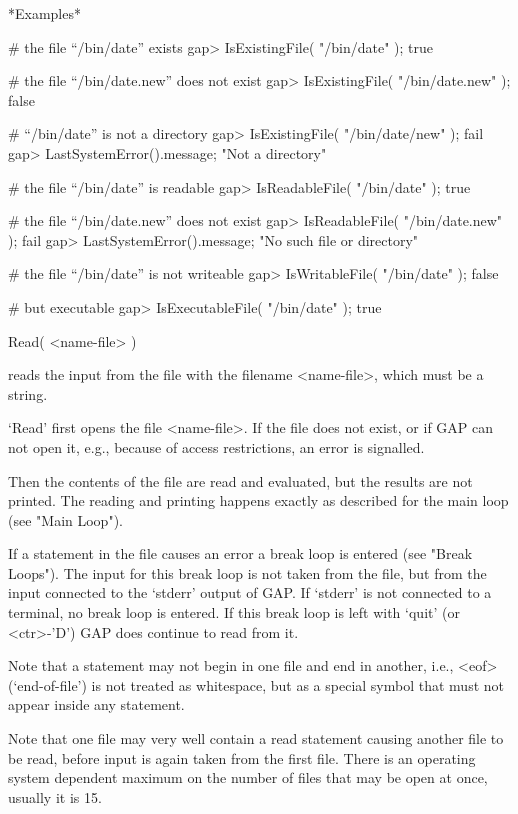 *Examples*

\beginexample
    # the file ``/bin/date'' exists
    gap> IsExistingFile( "/bin/date" );    
    true

    # the file ``/bin/date.new'' does not exist
    gap> IsExistingFile( "/bin/date.new" );
    false

    # ``/bin/date'' is not a directory
    gap> IsExistingFile( "/bin/date/new" );
    fail
    gap> LastSystemError().message;
    "Not a directory"

    # the file ``/bin/date'' is readable
    gap> IsReadableFile( "/bin/date" );
    true

    # the file ``/bin/date.new'' does not exist
    gap> IsReadableFile( "/bin/date.new" );
    fail
    gap> LastSystemError().message;        
    "No such file or directory"

    # the file ``/bin/date'' is not writeable
    gap> IsWritableFile( "/bin/date" );
    false

    # but executable
    gap> IsExecutableFile( "/bin/date" );
    true
\endexample



\>Read( <name-file> )

reads the input from the  file with the  filename <name-file>, which must
be a string.

`Read' first opens the file <name-file>.  If the file  does not exist, or
if GAP can not open it, e.g., because of access restrictions, an error is
signalled.

Then the contents of the file are read and evaluated, but the results are
not printed.  The reading and  printing happens exactly as described  for
the main loop (see "Main Loop").

If a statement in the file causes  an error a  break loop is entered (see
"Break  Loops").  The input   for this break loop  is  not taken from the
file, but from  the input connected to the  `stderr'  output of GAP.   If
`stderr' is not connected  to a terminal, no break  loop is  entered.  If
this break loop is left  with `quit' (or <ctr>-'D')  GAP does continue to
read from it.

Note that a statement may not begin in one file and end in another, i.e.,
<eof> (`end-of-file')   is not treated  as whitespace,  but  as a special
symbol that must not appear inside any statement.

Note that one file may very well contain a read statement causing another
file to be read, before input is again taken from the  first file.  There
is an operating system dependent maximum on the  number of files that may
be open at once, usually it is 15.

